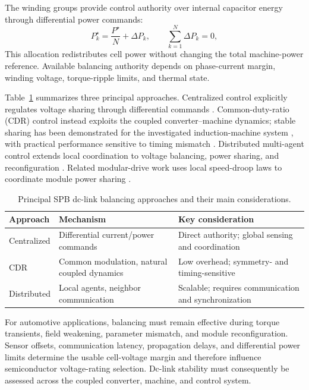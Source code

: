 The winding groups provide control authority over internal capacitor
energy through differential power commands:
\begin{equation}
P_k^\star=\frac{P^\star}{N}+\Delta P_k,
\qquad
\sum_{k=1}^{N}\Delta P_k=0,
\label{eq:balancing_power}
\end{equation}
This allocation redistributes cell power without changing the total
machine-power reference. Available balancing authority depends on
phase-current margin, winding voltage, torque-ripple limits, and
thermal state.

Table~\ref{fig:spb_balancing_taxonomy} summarizes three principal
approaches. Centralized control explicitly regulates voltage sharing
through differential commands \cite{Nikouie2015Stability,Nikouie2017Stability}.
Common-duty-ratio (CDR) control instead exploits the coupled
converter--machine dynamics; stable sharing has been demonstrated for
the investigated induction-machine system \cite{Mocevic2023CDR}, with
practical performance sensitive to timing mismatch \cite{Mocevic2024GateDelay}.
Distributed multi-agent control extends local coordination to voltage
balancing, power sharing, and reconfiguration
\cite{Verkroost2024VoltageBalance,Verkroost2024PowerDistribution,Verkroost2024Reconfiguration}. Related modular-drive work uses local
speed-droop laws to coordinate module power sharing
\cite{Galassini2016ModularSpeedDroop}.

\begin{table}[!t]
\centering
\caption{Principal SPB dc-link balancing approaches and their main
considerations.}
\label{fig:spb_balancing_taxonomy}
\renewcommand{\arraystretch}{1.15}
\setlength{\tabcolsep}{3pt}
\footnotesize
\begin{tabular}{p{1.6cm}p{2.9cm}p{2.6cm}}
\hline
\textbf{Approach} & \textbf{Mechanism} & \textbf{Key consideration}\\
\hline
Centralized & Differential current/power commands
\cite{Nikouie2015Stability,Nikouie2017Stability} &
Direct authority; global sensing and coordination\\
CDR & Common modulation, natural coupled dynamics
\cite{Mocevic2023CDR,Mocevic2024GateDelay} &
Low overhead; symmetry- and timing-sensitive\\
Distributed & Local agents, neighbor communication
\cite{Verkroost2024VoltageBalance,Verkroost2024PowerDistribution,Verkroost2024Reconfiguration} &
Scalable; requires communication and synchronization\\
\hline
\end{tabular}
\end{table}

For automotive applications, balancing must remain effective during
torque transients, field weakening, parameter mismatch, and module
reconfiguration. Sensor offsets, communication latency, propagation
delays, and differential power limits determine the usable cell-voltage
margin and therefore influence semiconductor voltage-rating selection.
Dc-link stability must consequently be assessed across the coupled
converter, machine, and control system.
